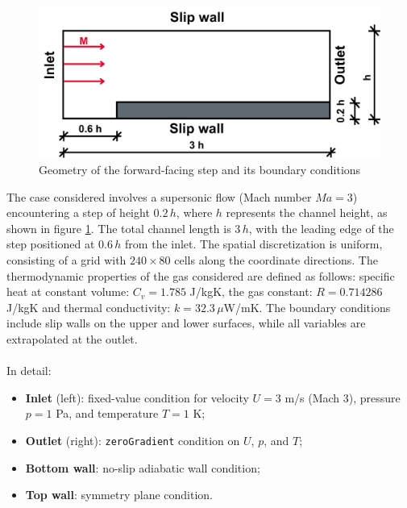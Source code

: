 \documentclass[a5paper]{sapthesis}
\begin{document}
	\begin{figure}[h]
		\centering
		\includegraphics[width=0.7 \linewidth]{Figures/FS_Geometry}
		\caption{Geometry of the forward-facing step and its boundary conditions}
		\label{FS_Geometry}
	\end{figure} 
	
	\noindent The case considered involves a supersonic flow (Mach number $Ma = 3$) encountering a step of height $0.2\,h$, where $h$ represents the channel height, as shown in figure \ref{FS_Geometry}. The total channel length is $3\,h$, with the leading edge of the step positioned at $0.6\,h$ from the inlet. The spatial discretization is uniform, consisting of a grid with $240 \times 80$ cells along the coordinate directions. 	The thermodynamic properties of the gas considered are defined as follows: specific heat at constant volume: $C_v = 1.785$ J/kgK, the gas constant: $R = 0.714286$ J/kgK and thermal conductivity: $k = 32.3 \,\mu$W/mK. The boundary conditions include slip walls on the upper and lower surfaces, while all variables are extrapolated at the outlet. \\
	\\
	In detail:
	
	\begin{itemize}
		\item \textbf{Inlet} (left): fixed-value condition for velocity $U = 3$ m/s (Mach 3), pressure $p = 1$ Pa, and temperature $T = 1$ K;
		\item \textbf{Outlet} (right): \texttt{zeroGradient} condition on $U$, $p$, and $T$;
		\item \textbf{Bottom wall}: no-slip adiabatic wall condition;
		\item \textbf{Top wall}: symmetry plane condition.
	\end{itemize}
	
\end{document}
